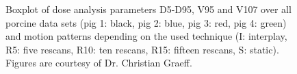 \begin{figure}[H]
{ }
\caption{Boxplot of dose analysis parameters D5-D95, V95 and V107 over all porcine data sets (pig 1: black, pig 2: blue, pig 3: red, pig 4: green) 
and motion patterns depending on the used technique (I: interplay, R5: five rescans, R10: ten rescans, R15: fifteen rescans, S: static). 
Figures are courtesy of Dr. Christian Graeff.}
\label{static_interplay_rescanning_ALLpigs_KORR}
\end{figure}


